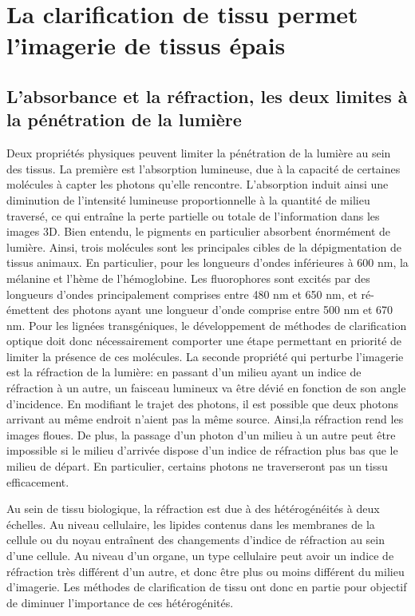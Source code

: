 \documentclass[\main/main.tex]{subfiles}
\begin{document}
\section{La clarification de tissu permet l'imagerie de tissus épais}

\subsection{L'absorbance et la réfraction, les deux limites à la pénétration de la lumière}

%
Deux propriétés physiques peuvent limiter la pénétration de la lumière au sein des tissus\cite{sandell_2011}. La première est l'absorption lumineuse, due à la capacité de certaines molécules à capter les photons qu'elle rencontre.
%
L'absorption induit ainsi une diminution de l'intensité lumineuse proportionnelle à la quantité de milieu traversé, ce qui entraîne la perte partielle ou totale de l'information dans les images 3D.
%
Bien entendu, le pigments en particulier absorbent énormément de lumière. Ainsi, trois molécules sont les principales cibles de la dépigmentation de tissus animaux\cite{sandell_2011,antinucci_2016,pende_2020}. En particulier, pour les longueurs d'ondes inférieures à 600 nm, la mélanine et l'hème de l'hémoglobine. Les fluorophores sont excités par des longueurs d'ondes principalement comprises entre 480 nm et 650 nm, et ré-émettent des photons ayant une longueur d'onde comprise entre 500 nm et 670 nm.
Pour les lignées transgéniques, le développement de méthodes de clarification optique doit donc nécessairement comporter une étape permettant en priorité de limiter la présence de ces molécules.
%
La seconde propriété qui perturbe l'imagerie est la réfraction de la lumière: en passant d'un milieu ayant un indice de réfraction à un autre, un faisceau lumineux va être dévié en fonction de son angle d'incidence. En modifiant le trajet des photons, il est possible que deux photons arrivant au même endroit n'aient pas la même source. Ainsi,la réfraction rend les images floues.
%
De plus, la passage d'un photon d'un milieu à un autre peut être impossible si le milieu d'arrivée dispose d'un indice de réfraction plus bas que le milieu de départ. En particulier, certains photons ne traverseront pas un tissu efficacement.

%
Au sein de tissu biologique, la réfraction est due à des hétérogénéités à deux échelles. Au niveau cellulaire, les lipides contenus dans les membranes de la cellule ou du noyau entraînent des changements d'indice de réfraction au sein d'une cellule. Au niveau d'un organe, un type cellulaire peut avoir un indice de réfraction très différent d'un autre, et donc être plus ou moins différent du milieu d'imagerie.
%
Les méthodes de clarification de tissu ont donc en partie pour objectif de diminuer l'importance de ces hétérogénités.
\end{document}
